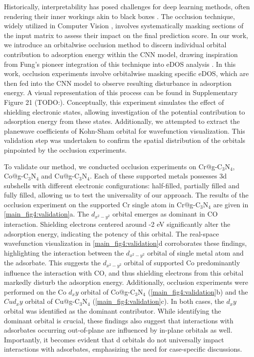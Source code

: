 Historically, interpretability has posed challenges for deep learning methods, often rendering their inner workings akin to black boxes \cite{zhang2018interpretable, zhang2018visual, savage2022breaking}.
The occlusion technique, widely utilized in Computer Vision \cite{zeiler2014visualizing, kortylewski2020combining, wang2020robust}, involves systematically masking sections of the input matrix to assess their impact on the final prediction score.
In our work, we introduce an orbitalwise occlusion method to discern individual orbital contribution to adsorption energy within the CNN model, drawing inspiration from Fung's pioneer integration of this technique into eDOS analysis \cite{fung2021machine}.
In this work, occlusion experiments involve orbitalwise masking specific eDOS, which are then fed into the CNN model to observe resulting disturbance in adsorption energy.
A visual representation of this process can be found in Supplementary Figure 21 (TODO:). Conceptually, this experiment simulates the effect of shielding electronic states, allowing investigation of the potential contribution to adsorption energy from these states.
Additionally, we attempted to extract the planewave coefficients of Kohn-Sham orbital for wavefunction visualization.
This validation step was undertaken to confirm the spatial distribution of the orbitals pinpointed by the occlusion experiments.

To validate our method, we conducted occlusion experiments on Cr@g-C$_3$N$_4$, Co@g-C$_3$N$_4$ and Cu@g-C$_3$N$_4$.
Each of these supported metals possesses 3d subshells with different electronic configurations: half-filled, partially filled and fully filled, allowing us to test the universality of our approach.
The results of the occlusion experiment on the supported Cr single atom in Cr@g-C$_3$N$_4$ are given in \cref{main_fig4:validation}a.
The $d_{x^2-y^2}$ orbital emerges as dominant in CO interaction.
Shielding electrons centered around -2 eV significantly alter the adsorption energy, indicating the potency of this orbital.
The real-space wavefunction visualization in \cref{main_fig4:validation}d corroborates these findings, highlighting the interaction between the $d_{x^2-y^2}$ orbital of single metal atom and the adsorbate.
This suggests the $d_{x^2-y^2}$ orbital of supported Co predominantly influence the interaction with CO, and thus shielding electrons from this orbital markedly disturb the adsorption energy.
Additionally, occlusion experiments were performed on the Co $d_xy$ orbital of Co@g-C$_3$N$_4$ (\cref{main_fig4:validation}b) and the $Cu d_xy$ orbital of Cu@g-C$_3$N$_4$ (\cref{main_fig4:validation}c).
In both cases, the $d_xy$ orbital was identified as the dominant contributor.
While identifying the dominant orbital is crucial, these findings also suggest that interactions with adsorbates occurring out-of-plane are influenced by in-plane orbitals as well.
Importantly, it becomes evident that d orbitals do not universally impact interactions with adsorbates, emphasizing the need for case-specific discussions.

